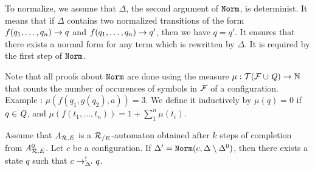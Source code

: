 To normalize, we assume that $\Delta$, the second argument of $\mathtt{Norm}$, is determinist. 
It means that if $\Delta$ contains two normalized transitions of the form 
$f(q_1, \dots, q_n) \rightarrow q$ and $f(q_1, \dots, q_n) \rightarrow q'$, then we have $q = q'$. 
It ensures that there exists a normal form for any term which is rewritten by $\Delta$.
It is required by the first step of $\mathtt{Norm}$.

Note that all proofs about $\mathtt{Norm}$ are done using the measure $\mu : \mathcal{ T(F \cup \mathit Q)} \rightarrow \mathbb N$ that counts the number of occurences of
symbols in $\mathcal{F}$ of a configuration. Example : $\mu(f(q_1, g(q_2), a)) = 3$.
We define it inductively by $\mu(q) = 0$ if $q \in \mathit Q$, and $\mu(f(t_1,\dots, t_n)) = 1 + \sum_1^n \mu(t_i)$.
   


\begin{lemma}
\label{lem:norm_determinism}
Assume that ${\it A}_{\mathcal R,E}$ is a ${\mathcal R_{/E}}$-automaton obtained after $k$ steps of completion
from ${\it A}_{\mathcal R,E}^0$. Let $c$ be a configuration. 
If $\Delta' = \mathtt{Norm}(c, \Delta \setminus \Delta^0)$, then there exists a state $q$ such that $c \rightarrow^!_{\Delta'} q$.
\end{lemma}

